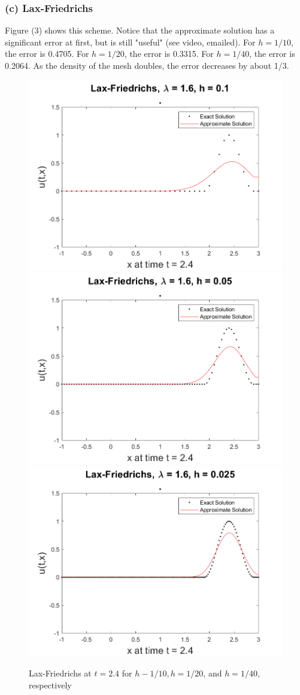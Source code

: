 \documentclass[12pt]{article}
\begin{document}
\subsubsection*{(c) Lax-Friedrichs}

Figure (3) shows this scheme. Notice that the approximate solution has a significant error at first, but is still "useful" (see video, emailed). For $h=1/10$, the error is 0.4705. For $h=1/20$, the error is 0.3315. For $h=1/40$, the error is 0.2064. As the density of the mesh doubles, the error decreases by about 1/3.

\begin{figure}
	\centering
	\includegraphics[width=.6\linewidth]{./code/c_lax_friedrichs_1_10th.png}	\includegraphics[width=.6\linewidth]{./code/c_lax_friedrichs_1_20th.png}
	\includegraphics[width=.6\linewidth]{./code/c_lax_friedrichs_1_40th.png}
	\caption{Lax-Friedrichs at $t=2.4$ for $h-1/10, h=1/20$, and $h=1/40$, respectively}
\end{figure}
\end{document}
